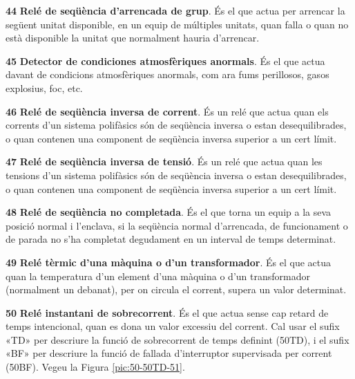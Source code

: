 \begin{multicols}{2}
\begin{list}{}
\item[\textbf{44}]   
\textbf{Relé de seqüència
d'arrencada de grup}. És el que actua per arrencar la següent unitat
disponible, en un equip de múltiples unitats, quan falla o quan no
està disponible la unitat que normalment hauria d'arrencar.

\item[\textbf{45}]   
\textbf{Detector de condiciones
atmosfèriques anormals}. És el que actua davant de condicions atmosfèriques anormals, com ara fums
perillosos, gasos explosius, foc, etc.

\item[\textbf{46}]   
\textbf{Relé de
seqüència inversa de corrent}. És un relé que actua quan els corrents
 d'un sistema polifàsics són de seqüència inversa o estan
desequilibrades, o quan contenen una component de seqüència inversa
superior a un cert límit.

\item[\textbf{47}]   
\textbf{Relé
de seqüència inversa de tensió}. És un relé que actua quan les
tensions d'un sistema polifàsics són de seqüència inversa o estan
desequilibrades, o quan contenen una component de seqüència inversa
superior a un cert límit.

\item[\textbf{48}]   
\textbf{Relé de seqüència
no completada}. És el que torna un equip a la seva posició normal  i
l'enclava, si la seqüència normal d'arrencada, de funcionament o de
parada no s'ha completat degudament en un interval de temps
determinat.

\item[\textbf{49}]  
\textbf{Relé tèrmic d'una màquina o d'un transformador}. És el que
actua quan la temperatura d'un element d'una màquina o d'un
transformador (normalment un debanat), per on circula el corrent,
supera un valor determinat.

\item[\textbf{50}]   
\textbf{Relé instantani de sobrecorrent}. És el que actua sense cap retard de temps intencional, quan es dona un valor excessiu del
corrent. Cal usar el sufix «TD» per descriure la funció de sobrecorrent de temps definint (50TD), i el sufix «BF» per descriure la funció de fallada d'interruptor supervisada per corrent (50BF). Vegeu la Figura \vref{pic:50-50TD-51}.


\end{list}
\end{multicols}
